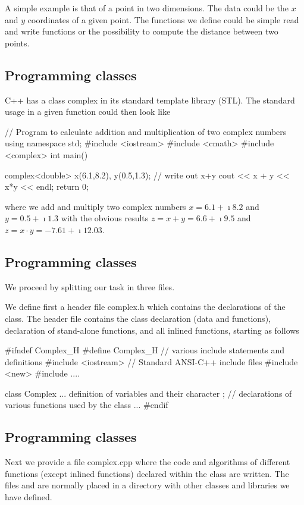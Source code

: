 \documentclass[%
twoside,                 %
final,                   %
10pt]{article}
\begin{document}
{{{{{{{A simple example is that of a point in two dimensions.
The data could be the $x$ and $y$ coordinates of a given  point. The functions
we define could be simple read and write functions or the possibility to compute the distance between two points.

\subsection{Programming classes}

C++ has a class complex in its standard
template library (STL). The standard usage in a given function could then look like

\bcppcod
// Program to calculate addition and multiplication of two complex numbers
using namespace std;
#include <iostream>
#include <cmath>
#include <complex>
int main()
{
  complex<double> x(6.1,8.2), y(0.5,1.3);
  // write out x+y
  cout << x + y << x*y  << endl;
  return 0;

\ecppcod
where we add and multiply two complex numbers $x=6.1+\imath 8.2$ and $y=0.5+\imath 1.3$ with the obvious results
$z=x+y=6.6+\imath 9.5$ and $z=x\cdot y= -7.61+\imath 12.03$.

\subsection{Programming classes}

We proceed by  splitting our task in three files.

We define first a header file complex.h  which contains the declarations of
the class. The header file contains the class declaration (data and
functions), declaration of stand-alone functions, and all inlined
functions, starting as follows

\bcppcod
#ifndef Complex_H
#define Complex_H
//   various include statements and definitions
#include <iostream>          // Standard ANSI-C++ include files
#include <new>
#include ....

class Complex
{...
definition of variables and their character
};
//   declarations of various functions used by the class
...
#endif
\ecppcod

\subsection{Programming classes}

Next we provide a file complex.cpp where the code and algorithms of
different functions (except inlined functions) declared within the
class are written.  The files  and  are normally
placed in a directory with other classes and libraries we have
defined.

}}}}}}}}
\end{document}
